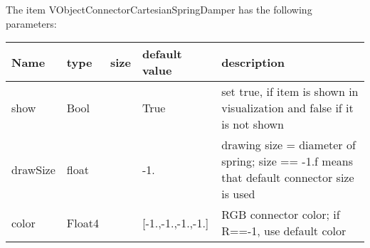 The item VObjectConnectorCartesianSpringDamper has the following parameters:
\begin{center}
  \footnotesize
  \begin{longtable}{| p{4.5cm} | p{2.5cm} | p{0.5cm} | p{2.5cm} | p{6cm} |}
    \hline
    \bf Name & \bf type & \bf size & \bf default value & \bf description \\ \hline
    show &     Bool &      &     True &     set true, if item is shown in visualization and false if it is not shown\\ \hline
    drawSize &     float &      &     -1. &     drawing size = diameter of spring; size == -1.f means that default connector size is used\\ \hline
    color &     Float4 &      &     [-1.,-1.,-1.,-1.] &     RGB connector color; if R==-1, use default color\\ \hline
	  \end{longtable}
	\end{center}

